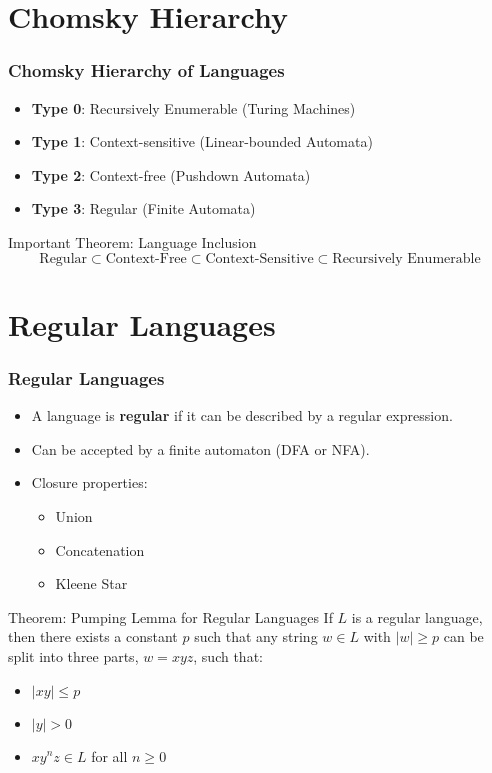 \documentclass{beamer}
\begin{document}
\section{Chomsky Hierarchy}
\begin{frame}
    \frametitle{Chomsky Hierarchy of Languages}
    \begin{itemize}
        \item \textbf{Type 0}: Recursively Enumerable (Turing Machines)
        \item \textbf{Type 1}: Context-sensitive (Linear-bounded Automata)
        \item \textbf{Type 2}: Context-free (Pushdown Automata)
        \item \textbf{Type 3}: Regular (Finite Automata)
    \end{itemize}
    \pause
    \begin{block}{Important Theorem: Language Inclusion}
        \[
        \text{Regular} \subset \text{Context-Free} \subset \text{Context-Sensitive} \subset \text{Recursively Enumerable}
        \]
    \end{block}
\end{frame}

\section{Regular Languages}
\begin{frame}
    \frametitle{Regular Languages}
    \begin{itemize}
        \item A language is \textbf{regular} if it can be described by a regular expression.
        \item Can be accepted by a finite automaton (DFA or NFA).
        \item Closure properties:
        \begin{itemize}
            \item Union
            \item Concatenation
            \item Kleene Star
        \end{itemize}
    \end{itemize}
    \pause
    \begin{block}{Theorem: Pumping Lemma for Regular Languages}
        If $L$ is a regular language, then there exists a constant $p$ such that any string $w \in L$ with $|w| \geq p$ can be split into three parts, $w = xyz$, such that:
        \begin{itemize}
            \item $|xy| \leq p$
            \item $|y| > 0$
            \item $xy^n z \in L$ for all $n \geq 0$
        \end{itemize}
    \end{block}
\end{frame}
\end{document}

